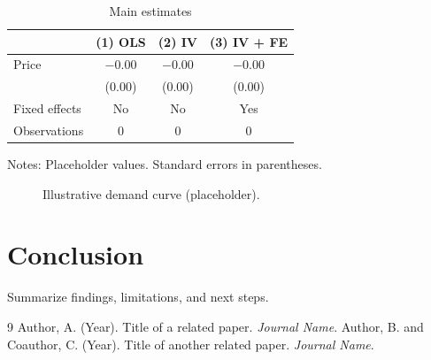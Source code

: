 \documentclass[12pt]{article}
\begin{document}
\begin{table}[ht]\centering
\begin{threeparttable}
\caption{Main estimates}\label{tab:main}
\begin{tabular}{lccc}
\toprule
 & (1) OLS & (2) IV & (3) IV + FE\\
\midrule
Price & $-0.00$ & $-0.00$ & $-0.00$\\
      & (0.00) & (0.00) & (0.00)\\
\midrule
Fixed effects & No & No & Yes\\
Observations  & 0 & 0 & 0\\
\bottomrule
\end{tabular}
\begin{tablenotes}\footnotesize
\item Notes: Placeholder values. Standard errors in parentheses.
\end{tablenotes}
\end{threeparttable}
\end{table}

\begin{figure}[ht]\centering
{}
\caption{Illustrative demand curve (placeholder).}\label{fig:demand}
\end{figure}

\section{Conclusion}
Summarize findings, limitations, and next steps.

\begin{thebibliography}{9}
 Author, A. (Year). Title of a related paper. \textit{Journal Name}.
 Author, B. and Coauthor, C. (Year). Title of another related paper. \textit{Journal Name}.
\end{thebibliography}
\end{document}
